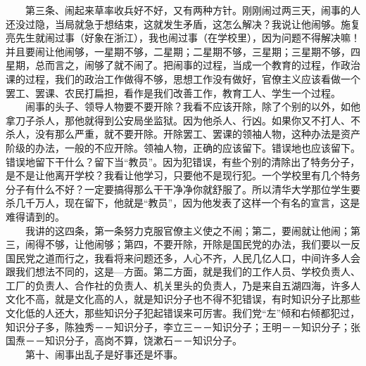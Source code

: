 \documentclass[cn,11pt,chinese]{elegantbook}
\begin{document}
　　第三条、闹起来草率收兵好不好，又有两种方针。刚刚闹过两三天，闹事的人还没过隐，当局就急于想结束，这就发生矛盾，这怎么解决？我说让他闹够。施复亮先生就闹过事（好象在浙江），我也闹过事（在学校里），因为问题不得解决嘛！并且要闹让他闹够，一星期不够，二星期；二星期不够，三星期；三星期不够，四星期，总而言之，闹够了就不闹了。把闹事的过程，当成一个教育的过程，作政治课的过程，我们的政治工作做得不够，思想工作没有做好，官僚主义应该看做一个罢工、罢课、农民打扁担，看作是我们改善工作，教育工人、学生一个过程。\\
　　闹事的头子、领导人物要不要开除？我看不应该开除，除了个别的以外，如他拿刀子杀人，那他就得到公安局坐监狱。因为他杀人、行凶。如果你又不打人、不杀人，没有那么严重，就不要开除。开除罢工、罢课的领袖人物，这种办法是资产阶级的办法，一般的不应开除。领袖人物，正确的应该留下。错误地也应该留下。错误地留下干什么？留下当“教员”。因为犯错误，有些个别的清除出了特务分子，是不是让他离开学校？我看让他学习，只要他不是现行犯。一个学校里有几个特务分子有什么不好？一定要搞得那么干干净净你就舒服了。所以清华大学那位学生要杀几千万人，现在留下，他就是“教员”，因为他发表了这样一个有名的宣言，这是难得请到的。\\
　　我讲的这四条，第一条努力克服官僚主义使之不闹；第二，要闹就让他闹；第三，闹得不够，让他闹够；第四，不要开除，开除是国民党的办法，我们要以一反国民党之道而行之，我看将来问题还多，人心不齐，人民几亿人口，中间许多人会跟我们想法不同的，这是—方面。第二方面，就是我们的工作人员、学校负责人、工厂的负责人、合作社的负责人、机关里头的负责人，乃是来自五湖四海，许多人文化不高，就是文化高的人，就是知识分子也不得不犯错误，有时知识分子比那些文化低的人还大，那些知识分子犯起错误来可厉害。我们党“左”倾和右倾都犯过，知识分子多，陈独秀－－知识分子，李立三－－知识分子；王明－－知识分子；张国焘－－知识分子，高岗不算，饶漱石－－知识分子。\\
　　第十、闹事出乱子是好事还是坏事。\\
\end{document}
